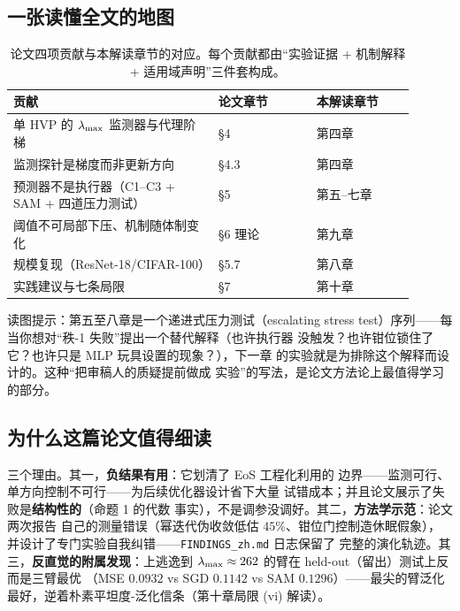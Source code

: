 \subsection{一张读懂全文的地图}\label{sec:ch01-map}

\begin{table}[!ht]
\centering\small
\caption{论文四项贡献与本解读章节的对应。每个贡献都由``实验证据 +
机制解释 + 适用域声明''三件套构成。}
\label{tab:ch01-map}
\begin{tabular}{p{0.46\linewidth}p{0.22\linewidth}p{0.22\linewidth}}
\toprule
贡献 & 论文章节 & 本解读章节 \\
\midrule
单 HVP 的 $\lambda_{\max}$ 监测器与代理阶梯 & \S4 & 第四章 \\
监测探针是梯度而非更新方向 & \S4.3 & 第四章 \\
预测器不是执行器（C1--C3 + SAM + 四道压力测试） & \S5 & 第五--七章 \\
阈值不可局部下压、机制随体制变化 & \S6 理论 & 第九章 \\
规模复现（ResNet-18/CIFAR-100） & \S5.7 & 第八章 \\
实践建议与七条局限 & \S7 & 第十章 \\
\bottomrule
\end{tabular}
\end{table}

读图提示：第五至八章是一个递进式压力测试（escalating stress test）序列——每当你想对``秩-1 失败''提出一个替代解释（也许执行器
没触发？也许钳位锁住了它？也许只是 MLP 玩具设置的现象？），下一章
的实验就是为排除这个解释而设计的。这种``把审稿人的质疑提前做成
实验''的写法，是论文方法论上最值得学习的部分。

\subsection{为什么这篇论文值得细读}\label{sec:ch01-why}

三个理由。其一，\textbf{负结果有用}：它划清了 EoS 工程化利用的
边界——监测可行、单方向控制不可行——为后续优化器设计省下大量
试错成本；并且论文展示了失败是\textbf{结构性的}（命题 1 的代数
事实），不是调参没调好。其二，\textbf{方法学示范}：论文两次报告
自己的测量错误（幂迭代伪收敛低估 $45\%$、钳位门控制造休眠假象），
并设计了专门实验自我纠错——\texttt{FINDINGS\_zh.md} 日志保留了
完整的演化轨迹。其三，\textbf{反直觉的附属发现}：上逃逸到
$\lambda_{\max}\approx 262$ 的臂在 held-out（留出）测试上反而是三臂最优
（MSE $0.0932$ vs SGD $0.1142$ vs SAM $0.1296$）——最尖的臂泛化
最好，逆着朴素平坦度-泛化信条（第十章局限 (vi) 解读）。

